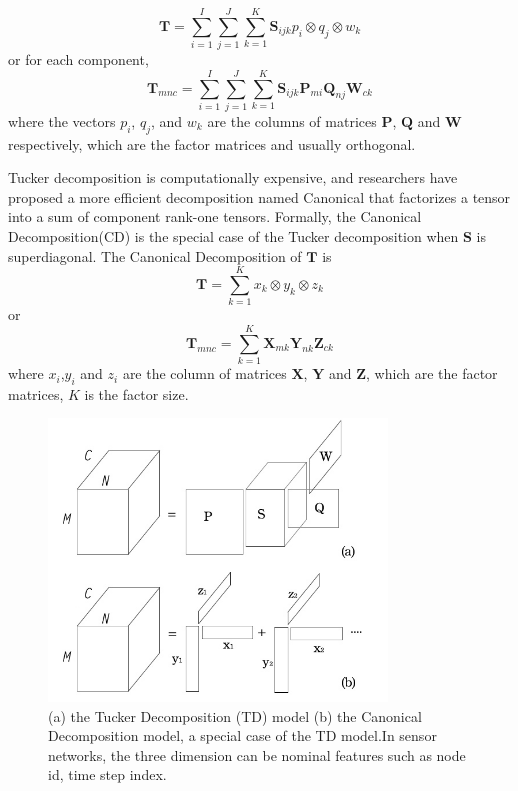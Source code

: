 \begin{equation*}
\mathbf{T}=\sum\limits_{i=1}^{I}\sum\limits_{j=1}^{J}\sum\limits_{k=1}^{K}\mathbf{S}_{ijk}p_i\otimes q_j\otimes w_k
\end{equation*}
or for each component,
\begin{equation*}
\mathbf{T}_{mnc}=\sum\limits_{i=1}^{I}\sum\limits_{j=1}^{J}\sum\limits_{k=1}^{K}\mathbf{S}_{ijk}\mathbf{P}_{m i}\mathbf{Q}_{n j}\mathbf{W}_{c k}
\end{equation*}
where the vectors $p_i$, $q_j$, and $w_k$ are the columns of matrices $\mathbf{P}$, $\mathbf{Q}$ and $\mathbf{W}$ respectively, which are the factor matrices and usually orthogonal.


Tucker decomposition is computationally expensive, and researchers have proposed a more efficient decomposition named Canonical that factorizes a tensor into a sum of component rank-one tensors.
Formally, the Canonical Decomposition(CD) is the special case of the Tucker decomposition when $\mathbf{S}$ is superdiagonal.
The Canonical Decomposition of $\mathbf{T}$ is
\begin{equation*}
\mathbf{T}=\sum\limits_{k=1}^{K}x_k\otimes y_k\otimes z_k
\end{equation*}
or
\begin{equation*}
\mathbf{T}_{mnc}=\sum\limits_{k=1}^{K}\mathbf{X}_{m k} \mathbf{Y}_{n k} \mathbf{Z}_{c k}
\end{equation*}
where $x_i$,$y_i$ and $z_i$ are the column of matrices $\mathbf{X}$, $\mathbf{Y}$ and $\mathbf{Z}$, which are the factor matrices, $K$ is the factor size. 

\begin{figure}[h] 
\includegraphics[width=9cm]{tf.jpg} 
\caption{ (a) the Tucker Decomposition (TD) model (b) the Canonical Decomposition model, a special case of the TD model.In sensor networks, the three dimension can be nominal features such as node id, time step index.} 
\label{fig:tf:tuckcanon} 
\end{figure}

